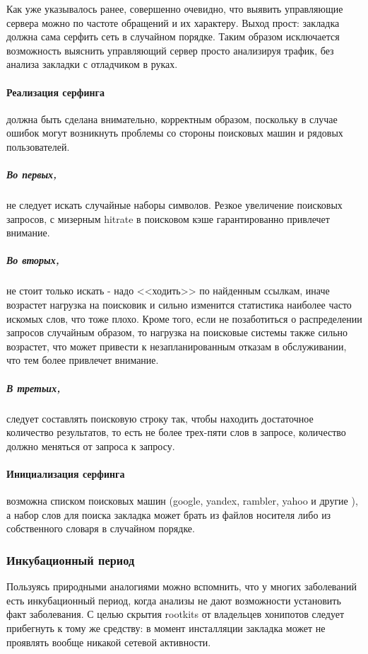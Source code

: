 Как уже указывалось ранее, совершенно очевидно, что  выявить управляющие
сервера можно  по частоте обращений и их характеру. Выход прост:
закладка должна сама серфить сеть в случайном порядке. Таким образом
исключается возможность выяснить управляющий сервер просто анализируя
трафик, без анализа закладки с отладчиком в руках.

\paragraph{Реализация серфинга}
должна быть сделана внимательно, корректным образом, поскольку в случае
ошибок могут возникнуть проблемы со стороны поисковых машин и рядовых
пользователей.

\subparagraph{Во первых,}
 не следует искать случайные наборы символов. Резкое увеличение
поисковых запросов, с мизерным hitrate в поисковом кэше гарантированно
привлечет внимание.

\subparagraph{Во вторых,}

 не стоит только искать - надо <<ходить>> по найденным ссылкам, иначе
возрастет нагрузка на поисковик и сильно изменится статистика наиболее
часто искомых слов, что тоже плохо. Кроме того, если не позаботиться  о
распределении запросов случайным образом, то нагрузка на поисковые
системы также сильно возрастет, что  может привести к незапланированным
отказам в обслуживании, что тем более привлечет внимание.

\subparagraph{В третьих,}
 следует составлять поисковую строку так, чтобы находить достаточное
количество  результатов, то есть не более трех-пяти слов в запросе,
количество должно меняться от запроса к запросу.

\paragraph{Инициализация серфинга}

возможна списком поисковых машин (google, yandex, rambler, yahoo и
другие ), а набор слов для поиска закладка  может брать из файлов
носителя либо из собственного словаря в случайном порядке.


\subsubsection{Инкубационный период}
\label{incubation_period}
Пользуясь природными аналогиями можно вспомнить, что у многих
заболеваний есть инкубационный период, когда анализы не дают возможности
установить факт заболевания. С целью скрытия rootkits от владельцев
хонипотов следует прибегнуть к тому же средству: в момент инсталляции
закладка может не проявлять вообще никакой сетевой активности.

